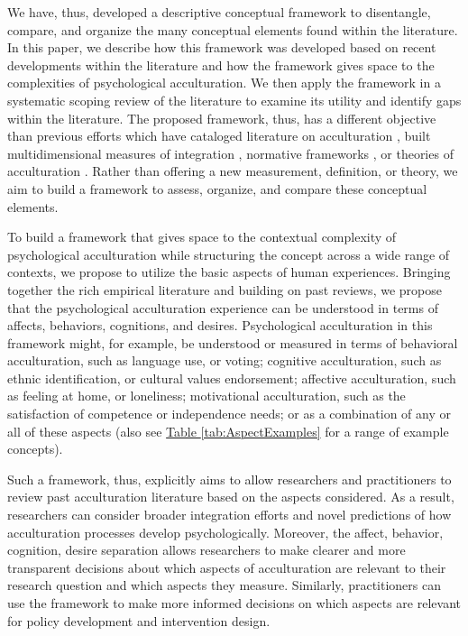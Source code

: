 \documentclass[man, 12pt, a4paper, mask]{apa7}
\newcommand{\tblref}[2][]{\hyperref[#2]{Table \ref*{#2}#1}}
\begin{document}
We have, thus, developed a descriptive conceptual framework to disentangle, compare, and organize the many conceptual elements found within the literature. In this paper, we describe how this framework was developed based on recent developments within the literature and how the framework gives space to the complexities of psychological acculturation. We then apply the framework in a systematic scoping review of the literature to examine its utility and identify gaps within the literature. The proposed framework, thus, has a different objective than previous efforts which have cataloged literature on acculturation \citep[e.g.,][]{Castels2003}, built multidimensional measures of integration \citep[e.g.,][]{Harder2018}, normative frameworks \citep[e.g.,][]{Ager2008a}, or theories of acculturation \citep[e.g.,][]{Berry2005}. Rather than offering a new measurement, definition, or theory, we aim to build a framework to assess, organize, and compare these conceptual elements. 

To build a framework that gives space to the contextual complexity of psychological acculturation while structuring the concept across a wide range of contexts, we propose to utilize the basic aspects of human experiences. Bringing together the rich empirical literature and building on past reviews, we propose that the psychological acculturation experience can be understood in terms of affects, behaviors, cognitions, and desires. Psychological acculturation in this framework might, for example, be understood or measured in terms of behavioral acculturation, such as language use, or voting; cognitive acculturation, such as ethnic identification, or cultural values endorsement; affective acculturation, such as feeling at home, or loneliness; motivational acculturation, such as the satisfaction of competence or independence needs; or as a combination of any or all of these aspects (also see \tblref{tab:AspectExamples} for a range of example concepts). 

Such a framework, thus, explicitly aims to allow researchers and practitioners to review past acculturation literature based on the aspects considered. As a result, researchers can consider broader integration efforts and novel predictions of how acculturation processes develop psychologically. Moreover, the affect, behavior, cognition, desire separation allows researchers to make clearer and more transparent decisions about which aspects of acculturation are relevant to their research question and which aspects they measure. Similarly, practitioners can use the framework to make more informed decisions on which aspects are relevant for policy development and intervention design. 
\end{document}
